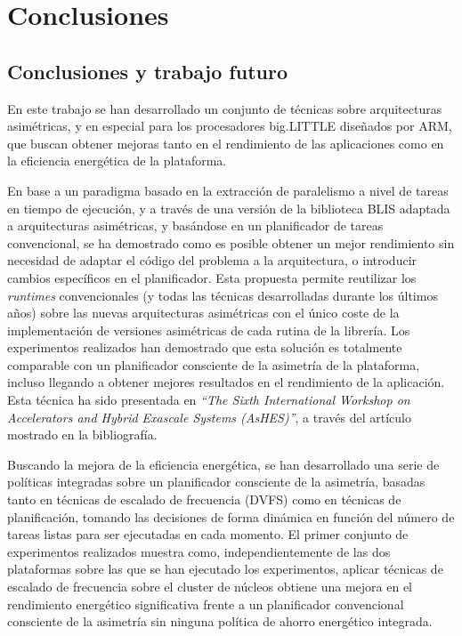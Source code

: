\cleardoublepage
\chapter{Conclusiones}
\label{ch:chapter6}

\section{Conclusiones y trabajo futuro}

En este trabajo se han desarrollado un conjunto de técnicas sobre
arquitecturas asimétricas, y en especial para los procesadores big.LITTLE
diseñados por ARM, que buscan obtener mejoras tanto en el rendimiento de las
aplicaciones como en la eficiencia energética de la plataforma.

En base a un paradigma basado en la extracción de paralelismo a nivel de
tareas en tiempo de ejecución, y a través de una versión de la biblioteca
BLIS adaptada a arquitecturas asimétricas, y basándose en un planificador
de tareas convencional, se ha demostrado como es posible obtener un mejor
rendimiento sin necesidad de adaptar el código del problema a la
arquitectura, o introducir cambios específicos en el planificador. Esta
propuesta permite reutilizar los \emph{runtimes} convencionales (y todas
las técnicas desarrolladas durante los últimos años) sobre las nuevas
arquitecturas asimétricas con el único coste de la implementación de
versiones asimétricas de cada rutina de la librería.  Los experimentos
realizados han demostrado que esta solución es totalmente comparable con un
planificador consciente de la asimetría de la plataforma, incluso llegando
a obtener mejores resultados en el rendimiento de la aplicación. Esta
técnica ha sido presentada en \emph{``The Sixth International Workshop on
  Accelerators and Hybrid Exascale Systems (AsHES)''}, a través del
artículo~\cite{ashes} mostrado en la bibliografía.

Buscando la mejora de la eficiencia energética, se han desarrollado una
serie de políticas integradas sobre un planificador consciente de la
asimetría, basadas tanto en técnicas de escalado de frecuencia (DVFS) como
en técnicas de planificación, tomando las decisiones de forma dinámica en
función del número de tareas listas para ser ejecutadas en cada momento. El
primer conjunto de experimentos realizados muestra como,
independientemente de las dos plataformas sobre las que se han ejecutado
los experimentos, aplicar técnicas de escalado de frecuencia sobre el
cluster de núcleos \BIG obtiene una mejora en el rendimiento energético
significativa frente a un planificador convencional consciente de la
asimetría sin ninguna política de ahorro energético integrada.

